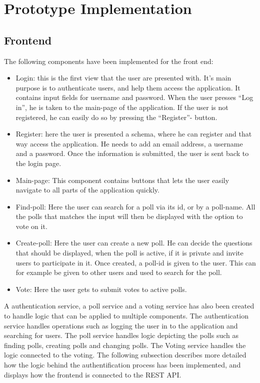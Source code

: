 \clearpage
\section{Prototype Implementation}
\label{sec:implementation}

\subsection{Frontend}
The following components have been implemented for the front end:

\begin{itemize}
	\item Login: this is the first view that the user are presented with. It’s main purpose is to
authenticate users, and help them access the application. It contains input fields for
username and password. When the user presses “Log in”, he is taken to the main-page of the
application. If the user is not registered, he can easily do so by pressing the “Register”-
button.
	\item Register: here the user is presented a schema, where he can register and that way access the
application. He needs to add an email address, a username and a password. Once the
information is submitted, the user is sent back to the login page.
	\item Main-page: This component contains buttons that lets the user easily navigate to all parts of
the application quickly.
	\item Find-poll: Here the user can search for a poll via its id, or by a poll-name. All the polls that
matches the input will then be displayed with the option to vote on it.
	\item Create-poll: Here the user can create a new poll. He can decide the questions that should be
displayed, when the poll is active, if it is private and invite users to participate in it. Once
created, a poll-id is given to the user. This can for example be given to other users and used
to search for the poll.
	\item Vote: Here the user gets to submit votes to active polls.
\end{itemize}

\noindent A authentication service, a poll service and a voting service has also been created to handle logic that
can be applied to multiple components. The authentication service handles operations such as
logging the user in to the application and searching for users. The poll service handles logic depicting
the polls such as finding polls, creating polls and changing polls. The Voting service handles the logic
connected to the voting.  The following subsection describes more detailed how the logic behind the authentification process has been implemented, 
and displays how the frontend is connected to the REST API. 

